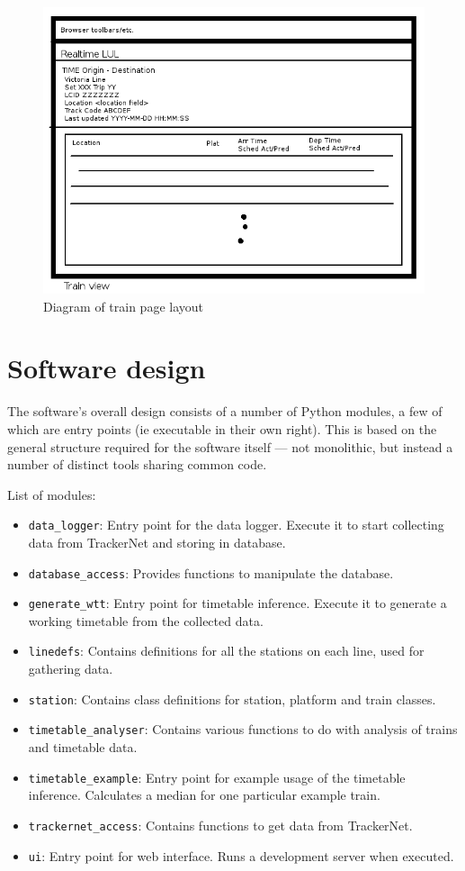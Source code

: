 \documentclass[a4paper,12pt,twoside]{report}
\begin{document}
\begin{figure}[h]
  \centering
  \includegraphics[width=\linewidth]{screen3}
  \caption{Diagram of train page layout}
  \label{fig:screen3}
\end{figure}

\section{Software design}

The software's overall design consists of a number of Python modules, a few of
which are entry points (ie executable in their own right). This is based on the
general structure required for the software itself --- not monolithic, but
instead a number of distinct tools sharing common code.

List of modules:
\begin{itemize}
  \item \texttt{data\_logger}: Entry point for the data logger. Execute it to
    start collecting data from TrackerNet and storing in database.
  \item \texttt{database\_access}: Provides functions to manipulate the
    database.
  \item \texttt{generate\_wtt}: Entry point for timetable inference. Execute it
    to generate a working timetable from the collected data.
  \item \texttt{linedefs}: Contains definitions for all the stations on each
    line, used for gathering data.
  \item \texttt{station}: Contains class definitions for station, platform and
    train classes.
  \item \texttt{timetable\_analyser}: Contains various functions to do with
    analysis of trains and timetable data.
  \item \texttt{timetable\_example}: Entry point for example usage of the
    timetable inference. Calculates a median for one particular example train.
  \item \texttt{trackernet\_access}: Contains functions to get data from
    TrackerNet.
  \item \texttt{ui}: Entry point for web interface. Runs a development server
    when executed.
\end{itemize}
\end{document}
